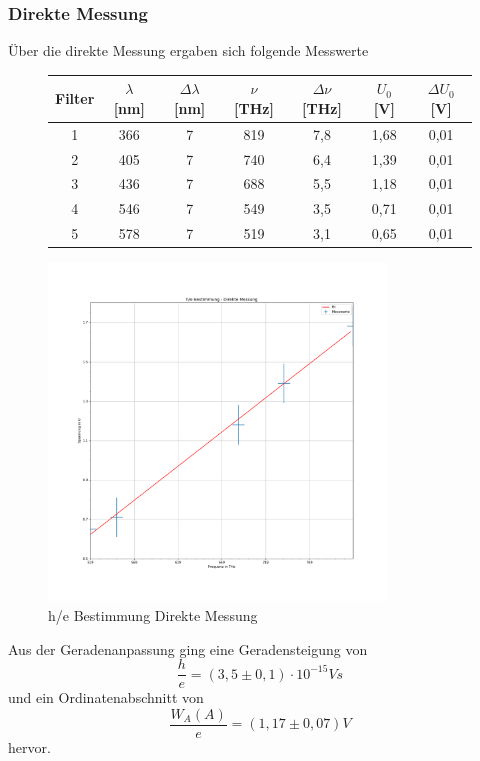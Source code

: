 \documentclass{scrartcl}
\begin{document}
		\subsubsection{Direkte Messung}
			Über die direkte Messung ergaben sich folgende Messwerte 
			\begin{figure}[H]
				\centering
				\begin{tabular}{|c|c|c|c|c|c|c|}
					\hline
					Filter & $\lambda$ [nm] & $\Delta\lambda$ [nm] & $\nu$ [THz] & $\Delta\nu$ [THz] & $U_0$ [V] & $\Delta U_0$ [V] \\
					\hline
					1 & 366 & 7 & 819 & 7,8 & 1,68 & 0,01\\
					2 & 405 & 7 & 740 & 6,4 & 1,39 & 0,01\\ 
					3 & 436 & 7 & 688 & 5,5 & 1,18 & 0,01\\
					4 & 546 & 7 & 549 & 3,5 & 0,71 & 0,01\\
					5 & 578 & 7 & 519 & 3,1 & 0,65 & 0,01\\
					\hline
				\end{tabular}
			\end{figure}
			\begin{figure}[H]
				\centering
				\includegraphics[width=0.8\textwidth]{he_direkt.png}
				\caption{h/e Bestimmung Direkte Messung}
			\end{figure}
			Aus der Geradenanpassung ging eine Geradensteigung von 
			\begin{equation}
				\frac{h}{e}= (3,5\pm 0,1)\cdot 10^{-15}V s
			\end{equation}
			und ein Ordinatenabschnitt von
			\begin{equation}
				\frac{W_A(A)}{e} = (1,17\pm 0,07)V
			\end{equation}
			hervor.
\end{document}

